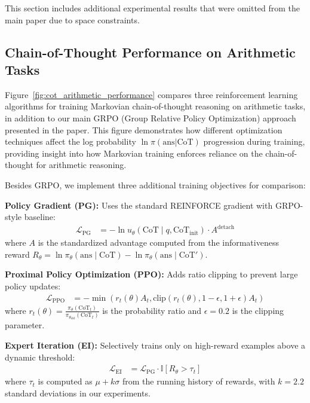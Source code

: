 \documentclass{article}
\begin{document}
This section includes additional experimental results that were omitted from the main paper due to space constraints.

\subsection{Chain-of-Thought Performance on Arithmetic Tasks}
Figure~\ref{fig:cot_arithmetic_performance} compares three reinforcement learning algorithms for training Markovian chain-of-thought reasoning on arithmetic tasks, in addition to our main GRPO (Group Relative Policy Optimization) approach presented in the paper. This figure demonstrates how different optimization techniques affect the log probability $\ln \pi(\text{ans} | \text{CoT})$ progression during training, providing insight into how Markovian training enforces reliance on the chain-of-thought for arithmetic reasoning.

Besides GRPO, we implement three additional training objectives for comparison:

\textbf{Policy Gradient (PG):} Uses the standard REINFORCE gradient with GRPO-style baseline:
\begin{align}
\mathcal{L}_{\text{PG}} &= -\ln u_\theta(\text{CoT} \mid q, \text{CoT}_{\text{init}}) \cdot A^{\text{detach}}
\end{align}
where $A$ is the standardized advantage computed from the informativeness reward $R_\theta = \ln \pi_\theta(\text{ans} \mid \text{CoT}) - \ln \pi_\theta(\text{ans} \mid \text{CoT}')$.

\textbf{Proximal Policy Optimization (PPO):} Adds ratio clipping to prevent large policy updates:
\begin{align}
\mathcal{L}_{\text{PPO}} &= -\min(r_t(\theta) A_t, \text{clip}(r_t(\theta), 1-\epsilon, 1+\epsilon) A_t)
\end{align}
where $r_t(\theta) = \frac{\pi_\theta(\text{CoT}_t)}{\pi_{\theta_{\text{old}}}(\text{CoT}_t)}$ is the probability ratio and $\epsilon = 0.2$ is the clipping parameter.

\textbf{Expert Iteration (EI):} Selectively trains only on high-reward examples above a dynamic threshold:
\begin{align}
\mathcal{L}_{\text{EI}} &= \mathcal{L}_{\text{PG}} \cdot \mathbb{I}[R_\theta > \tau_t]
\end{align}
where $\tau_t$ is computed as $\mu + k\sigma$ from the running history of rewards, with $k = 2.2$ standard deviations in our experiments.
\end{document}
